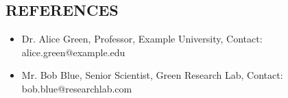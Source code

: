 \documentclass[9pt,margin]{res}
\begin{document}
\begin{resume}
    \noindent\hrulefill %
\section{REFERENCES}
    \vspace{1em}
    \begin{itemize}[label={--}]
        \item Dr. Alice Green, Professor, Example University, Contact: alice.green@example.edu
        \item Mr. Bob Blue, Senior Scientist, Green Research Lab, Contact: bob.blue@researchlab.com
    \end{itemize}
\end{resume}
\end{document}
